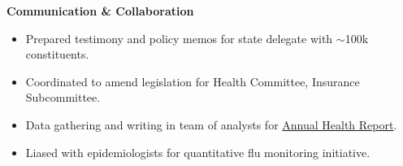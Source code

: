 \documentclass[margin]{res}
\begin{document}
\begin{sloppypar}
\begin{resume}


\textbf{Communication \& Collaboration} \\
\begin{itemize}
    \item Prepared testimony and policy memos for state delegate with $\sim$100k constituents. 
    \item Coordinated to amend legislation for Health Committee, Insurance Subcommittee.
\end{itemize}

\begin{itemize}
    \item Data gathering and writing in team of analysts for \href{http://www.baltimorehealth.org/hsr2008.html}{Annual Health Report}.
    \item Liased with epidemiologists for quantitative flu monitoring initiative.
\end{itemize}






\end{resume}
\end{sloppypar}
\end{document}
